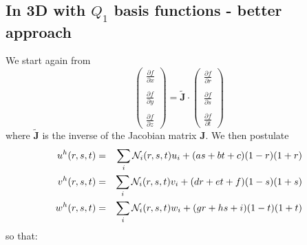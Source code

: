 \subsection{In 3D with $Q_1$ basis functions - better approach}

We start again from 
\[
\left(
\begin{array}{c}
\frac{\partial f}{\partial x} \\ \\
\frac{\partial f}{\partial y} \\ \\
\frac{\partial f}{\partial z} 
\end{array}
\right)
=
\tilde{\bm J} \cdot
\left(
\begin{array}{c}
\frac{\partial f}{\partial r} \\ \\
\frac{\partial f}{\partial s} \\ \\ 
\frac{\partial f}{\partial t} 
\end{array}
\right)
\]
where $\tilde{\bm J}$ is the inverse of the Jacobian matrix ${\bm J}$. We then postulate 
\begin{eqnarray}
u^h(r,s,t)&=&\sum_i {\mathcal{N}}_i(r,s,t) u_i + (a s + b t +c)(1-r)(1+r) \nonumber\\
v^h(r,s,t)&=&\sum_i {\mathcal{N}}_i(r,s,t) v_i + (d r + e t +f)(1-s)(1+s) \nonumber\\
w^h(r,s,t)&=&\sum_i {\mathcal{N}}_i(r,s,t) w_i + (g r + h s +i)(1-t)(1+t) \nonumber
\end{eqnarray}
so that:
